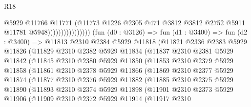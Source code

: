 \begin{lexlean}{R18}
\begin{coremodule}
                                      @5929
                                      @11766
                                      @11771
                                      (@11773
                                        @1226
                                        @2305
                                        @471
                                        @3812
                                        @3812
                                        @2752
                                        @5911
                                        @11781
                                        @5948))))))))))))))))
        (fun (d0 : @3126) =>
        fun (d1 : @3400) =>
        fun (d2 : @3400) =>
        @11813
          @2310
          @2384
          @5929
          @11818
          (@11821
            @2336
            @2383
            @5929
            @11826
            (@11829
              @2310
              @2382
              @5929
              @11834
              (@11837
                @2310
                @2381
                @5929
                @11842
                (@11845
                  @2310
                  @2380
                  @5929
                  @11850
                  (@11853
                    @2310
                    @2379
                    @5929
                    @11858
                    (@11861
                      @2310
                      @2378
                      @5929
                      @11866
                      (@11869
                        @2310
                        @2377
                        @5929
                        @11874
                        (@11877
                          @2310
                          @2376
                          @5929
                          @11882
                          (@11885
                            @2310
                            @2375
                            @5929
                            @11890
                            (@11893
                              @2310
                              @2374
                              @5929
                              @11898
                              (@11901
                                @2310
                                @2373
                                @5929
                                @11906
                                (@11909
                                  @2310
                                  @2372
                                  @5929
                                  @11914
                                  (@11917
                                    @2310

\end{coremodule}
\end{lexlean}
